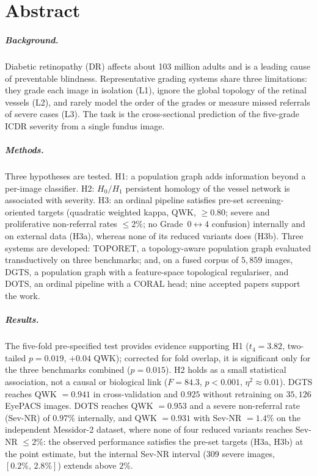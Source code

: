 \chapter*{Abstract}
\begingroup{}

\paragraph{Background.}
Diabetic retinopathy (DR) affects about 103 million adults and is a leading cause of
preventable blindness. Representative grading systems share three
limitations: they grade each image in isolation (L1), ignore the global topology of the
retinal vessels (L2), and rarely model the order of the grades or measure missed referrals
of severe cases (L3). The task is the cross-sectional prediction of the five-grade ICDR
severity from a single fundus image.

\paragraph{Methods.}
Three hypotheses are tested. H1: a population graph adds information beyond a per-image
classifier. H2: $H_0/H_1$ persistent homology of the vessel network is associated with
severity. H3: an ordinal pipeline satisfies pre-set screening-oriented targets (quadratic weighted kappa,
QWK, $\geq0.80$; severe and proliferative non-referral rates $\leq2\%$; no
Grade~$0\leftrightarrow4$ confusion) internally and on external data (H3a), whereas none of
its reduced variants does (H3b). Three systems are developed: TOPORET, a topology-aware
population graph evaluated transductively on three benchmarks; and, on a fused corpus of
$5{,}859$ images, DGTS, a population graph with a feature-space topological regulariser, and DOTS, an
ordinal pipeline with a CORAL head; nine accepted papers support the work.

\paragraph{Results.}
The five-fold pre-specified test provides evidence supporting H1 ($t_4=3.82$, two-tailed $p=0.019$,
$+0.04$ QWK); corrected for fold overlap, it is significant only for the three benchmarks
combined ($p=0.015$). H2 holds as a small statistical association, not
a causal or biological link ($F=84.3$, $p<0.001$, $\eta^2\approx0.01$). DGTS reaches QWK $=0.941$ in cross-validation and $0.925$
without retraining on $35{,}126$ EyePACS images. DOTS reaches QWK $=0.953$ and a severe
non-referral rate (Sev-NR) of $0.97\%$ internally, and QWK $=0.931$ with Sev-NR $=1.4\%$ on
the independent Messidor-2 dataset, where none of four reduced variants reaches Sev-NR
$\leq2\%$: the observed performance satisfies the pre-set targets (H3a, H3b) at the
point estimate, but the internal Sev-NR interval ($309$ severe images, $[0.2\%,\,2.8\%]$)
extends above $2\%$.

